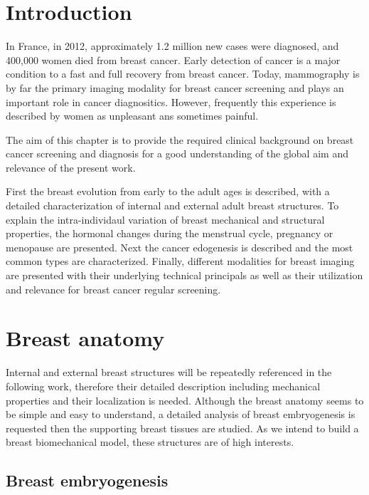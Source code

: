 \section{Introduction}\label{section:background:introduction}

In France, in 2012, approximately 1.2 million new cases were diagnosed, and 400,000 women died from breast cancer. Early detection of cancer is a major condition to a fast and full recovery from breast cancer. Today, mammography is by far the primary imaging modality for breast cancer screening and plays an important role in cancer diagnositics. However, frequently  this experience is described by women as unpleasant ans sometimes painful.

The aim of this chapter is to provide the required clinical background on breast cancer screening and diagnosis for a good understanding of the global aim and relevance of the present work. 

First the breast evolution from early to the adult ages is described, with a detailed characterization of internal and external adult breast structures. To explain the intra-individaul variation of breast mechanical and structural properties, the hormonal changes during the menstrual cycle, pregnancy or menopause are presented.   Next the cancer edogenesis is described and the most common types are characterized. Finally, different modalities for breast imaging are presented with their underlying technical principals  as well as their utilization and relevance for breast cancer regular screening.

\clearpage
\section{Breast anatomy}\label{section:breastanatomy}

Internal and external breast structures will be repeatedly referenced in the following work, therefore their detailed description including mechanical properties and their localization is needed. Although the breast anatomy seems to be simple and easy to understand, a detailed analysis of breast embryogenesis is requested then the supporting breast tissues are studied. As we intend to build a breast biomechanical model, these structures are of high interests.  

  
\subsection{Breast embryogenesis}\label{subsection:breastembryogenesis}

